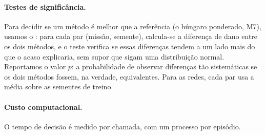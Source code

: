 \paragraph{Testes de significância.} Para decidir se um método é melhor que a referência (o húngaro ponderado, M7), usamos o
: para cada par (missão, semente), calcula-se a diferença de dano entre os dois métodos,
e o teste verifica se essas diferenças tendem a um lado mais do que o acaso explicaria, sem supor que sigam uma
distribuição normal. Reportamos o valor $p$: a probabilidade de observar diferenças tão sistemáticas se os dois métodos
fossem, na verdade, equivalentes. Para as redes, cada par usa a média sobre as sementes de treino.

\paragraph{Custo computacional.} O tempo de decisão é medido por chamada, com um processo por episódio.
